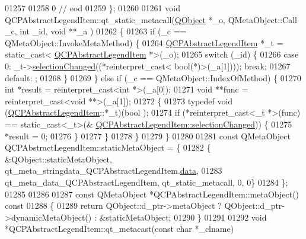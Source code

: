 \begin{DoxyCode}
01257 
01258        0        \textcolor{comment}{// eod}
01259 \};
01260 
01261 \textcolor{keywordtype}{void} QCPAbstractLegendItem::qt\_static\_metacall(\hyperlink{a00059}{QObject} *\_o, QMetaObject::Call \_c, \textcolor{keywordtype}{int} \_id, \textcolor{keywordtype}{void} **\_a
      )
01262 \{
01263     \textcolor{keywordflow}{if} (\_c == QMetaObject::InvokeMetaMethod) \{
01264         \hyperlink{a00023}{QCPAbstractLegendItem} *\_t = \textcolor{keyword}{static\_cast<}
      \hyperlink{a00023}{QCPAbstractLegendItem} *\textcolor{keyword}{>}(\_o);
01265         \textcolor{keywordflow}{switch} (\_id) \{
01266         \textcolor{keywordflow}{case} 0: \_t->\hyperlink{a00023_a7cb61fdfbaf69c590bacb8f9e7099d9e}{selectionChanged}((*\textcolor{keyword}{reinterpret\_cast<} \textcolor{keywordtype}{bool}(*)\textcolor{keyword}{>}(\_a[1]))); \textcolor{keywordflow}{break};
01267         \textcolor{keywordflow}{default}: ;
01268         \}
01269     \} \textcolor{keywordflow}{else} \textcolor{keywordflow}{if} (\_c == QMetaObject::IndexOfMethod) \{
01270         \textcolor{keywordtype}{int} *result = \textcolor{keyword}{reinterpret\_cast<}\textcolor{keywordtype}{int} *\textcolor{keyword}{>}(\_a[0]);
01271         \textcolor{keywordtype}{void} **func = \textcolor{keyword}{reinterpret\_cast<}\textcolor{keywordtype}{void} **\textcolor{keyword}{>}(\_a[1]);
01272         \{
01273             \textcolor{keyword}{typedef} void (\hyperlink{a00023}{QCPAbstractLegendItem}::*\_t)(bool );
01274             \textcolor{keywordflow}{if} (*reinterpret\_cast<\_t *>(func) == \textcolor{keyword}{static\_cast<}\_t\textcolor{keyword}{>}(&
      \hyperlink{a00023_a7cb61fdfbaf69c590bacb8f9e7099d9e}{QCPAbstractLegendItem::selectionChanged})) \{
01275                 *result = 0;
01276             \}
01277         \}
01278     \}
01279 \}
01280 
01281 \textcolor{keyword}{const} QMetaObject QCPAbstractLegendItem::staticMetaObject = \{
01282     \{ &QObject::staticMetaObject, qt\_meta\_stringdata\_QCPAbstractLegendItem.\hyperlink{a00067_a98fcd80c37c93a0b0b71f18405466d42}{data},
01283       qt\_meta\_data\_QCPAbstractLegendItem,  qt\_static\_metacall, 0, 0\}
01284 \};
01285 
01286 
01287 \textcolor{keyword}{const} QMetaObject *QCPAbstractLegendItem::metaObject()\textcolor{keyword}{ const}
01288 \textcolor{keyword}{}\{
01289     \textcolor{keywordflow}{return} QObject::d\_ptr->metaObject ? QObject::d\_ptr->dynamicMetaObject() : &staticMetaObject;
01290 \}
01291 
01292 \textcolor{keywordtype}{void} *QCPAbstractLegendItem::qt\_metacast(\textcolor{keyword}{const} \textcolor{keywordtype}{char} *\_clname)

\end{DoxyCode}
